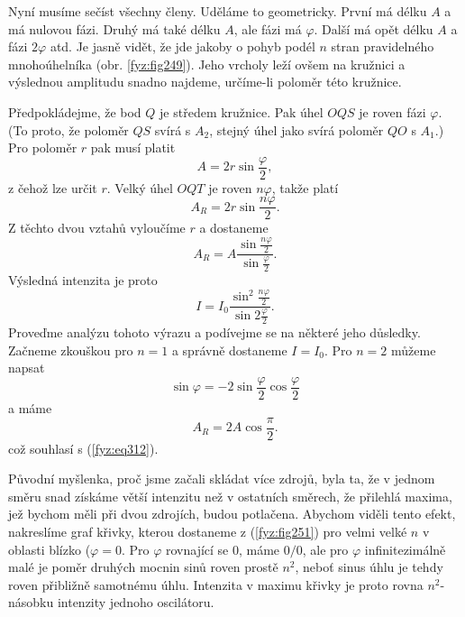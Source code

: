 {    Nyní musíme sečíst všechny členy. Uděláme to geometricky. První má délku \(A\) a má nulovou 
    fázi. Druhý má také délku \(A\), ale fázi má \(\varphi\). Další má opět délku \(A\) a fázi
    \(2\varphi\) atd. Je jasně vidět, že jde jakoby o pohyb podél \(n\) stran pravidelného 
    mnohoúhelníka (obr. \ref{fyz:fig249}). Jeho vrcholy leží ovšem na kružnici a výslednou 
    amplitudu snadno najdeme, určíme-li poloměr této kružnice.
    
    Předpokládejme, že bod \(Q\) je středem kružnice. Pak úhel \(OQS\) je roven fázi \(\varphi\). 
    (To proto, že poloměr \(QS\) svírá s \(A_2\), stejný úhel jako svírá poloměr \(QO\) s \(A_1\).) 
    Pro poloměr \(r\) pak musí platit
    \begin{equation}\label{fyz:eq317}
      A = 2r\sin\frac{\varphi}{2},
    \end{equation}
    z čehož lze určit \(r\). Velký úhel \(OQT\) je roven \(n\varphi\), takže platí
    \begin{equation}\label{fyz:eq318}
      A_R = 2r\sin\frac{n\varphi}{2}.
    \end{equation}
    Z těchto dvou vztahů vyloučíme \(r\) a dostaneme 
    \begin{equation}\label{fyz:eq319}
      A_R = A\dfrac{\sin\frac{n\varphi}{2}}{\sin\frac{\varphi}{2}}.
    \end{equation}
    Výsledná intenzita je proto
    \begin{equation}\label{fyz:eq320}
      I = I_0\dfrac{\sin^2\frac{n\varphi}{2}}{\sin2\frac{\varphi}{2}}.
    \end{equation}
    Proveďme analýzu tohoto výrazu a podívejme se na některé jeho důsledky. Začneme zkouškou pro 
    \(n = 1\) a správně dostaneme \(I = I_0\). Pro \(n = 2\) můžeme napsat 
    \begin{equation*}
      \sin\varphi = -2\sin\frac{\varphi}{2}\cos\frac{\varphi}{2}
    \end{equation*}
    a máme
    \begin{equation*}
      A_R = 2A\cos\frac{\pi}{2}.
    \end{equation*}
    což souhlasí s (\ref{fyz:eq312}).
    
    Původní myšlenka, proč jsme začali skládat více zdrojů, byla ta, že v jednom směru snad získáme 
    větší intenzitu než v ostatních směrech, že přilehlá maxima, jež bychom měli při dvou zdrojích, 
    budou potlačena. Abychom viděli tento efekt, nakreslíme graf křivky, kterou dostaneme z 
    (\ref{fyz:fig251}) pro velmi velké \(n\) v oblasti blízko (\(\varphi = 0\). Pro \(\varphi\) 
    rovnající se \(0\), máme \(0/0\), ale pro \(\varphi\) infinitezimálně malé je poměr druhých 
    mocnin sinů roven prostě \(n^2\), neboť sinus úhlu je tehdy roven přibližně samotnému úhlu. 
    Intenzita v maximu křivky je proto rovna \(n^2\)-násobku intenzity jednoho oscilátoru.
     
}
